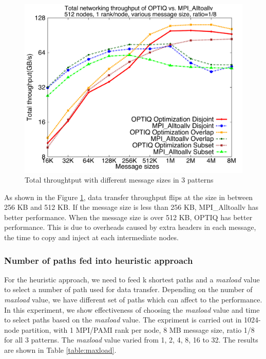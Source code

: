 \begin{figure}[!htb]
\vspace{-0.1in}
\centering
\includegraphics[scale=0.30]{figures/messagesize.pdf}
\vspace{-0.1in}
\caption{Total throughtput with different message sizes in 3 patterns}
\vspace{-0.1in}
\label{fig:messagesize}
\end{figure}

As shown in the Figure \ref{fig:messagesize}, data transfer throughput flips at the size in between 256 KB and 512 KB. If the message size is less than 256 KB, MPI\_Alltoallv has better performance. When the message size is over 512 KB, OPTIQ has better performance. This is due to overheads caused by extra headers in each message, the time to copy and inject at each intermediate nodes.

\subsubsection{Number of paths fed into heuristic approach}

For the heuristic approach, we need to feed k shortest paths and a \textit{maxload} value to select a number of path used for data transfer. Depending on the number of \textit{maxload} value, we have different set of paths which can affect to the performance.  In this experiment, we show effectiveness of choosing the \textit{maxload} value and time to select paths based on the \textit{maxload} value. The expriment is carried out in 1024-node partition, with 1 MPI/PAMI rank per node, 8 MB message size, ratio 1/8 for all 3 patterns. The \textit{maxload} value varied from 1, 2, 4, 8, 16 to 32. The results are shown in Table \ref{table:maxload}. 

